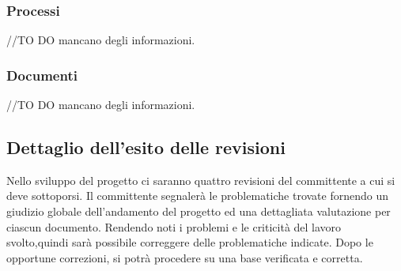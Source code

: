 \documentclass[12pt,a4paper]{article}
\begin{document}
\subsubsection{Processi}
//TO DO \IB mancano degli informazioni.
\subsubsection{Documenti}
//TO DO \IB mancano degli informazioni.
\subsection{Dettaglio dell'esito delle revisioni}
Nello sviluppo del progetto ci saranno quattro revisioni del committente a cui si deve sottoporsi. Il committente segnalerà le problematiche trovate fornendo un giudizio globale dell'andamento del progetto ed una dettagliata valutazione per ciascun documento. Rendendo noti i problemi e le criticità del lavoro svolto,quindi sarà possibile correggere delle problematiche indicate. Dopo le opportune correzioni, si potrà procedere su una base verificata e corretta.
\end{document}
